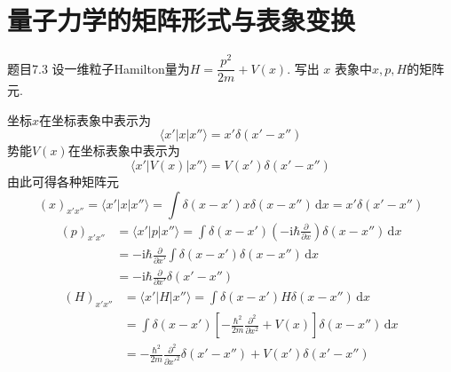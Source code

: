 \section{量子力学的矩阵形式与表象变换}

\begin{question}{题目7.3}
    设一维粒子Hamilton量为$H=\dfrac{p^2}{2m}+V(x)$. 写出 $x$ 表象中$x,p,H$的矩阵元.
\end{question}
\begin{solution}
    坐标$x$在坐标表象中表示为
    $$
        \langle x'|x|x'' \rangle = x'\delta(x'-x'')
    $$
    势能$V(x)$在坐标表象中表示为
    $$
        \langle x'|V(x)|x'' \rangle = V(x')\delta(x'-x'')
    $$
    由此可得各种矩阵元
    $$
        (x)_{x'x''} = \langle x'|x|x'' \rangle
        = \int\delta(x-x')x\delta(x-x'')\,\mathrm{d}x
        = x'\delta(x'-x'')
    $$
    $$
        \begin{aligned}
            (p)_{x'x''}
             & = \langle x'|p|x'' \rangle = \int\delta(x-x')\left(-\mathrm{i}\hbar\frac{\partial }{\partial x}\right)\delta(x-x'')\,\mathrm{d}x \\
             & = -\mathrm{i}\hbar\frac{\partial }{\partial x'}\int\delta(x-x')\delta(x-x'')\,\mathrm{d}x                                        \\
             & = -\mathrm{i}\hbar\frac{\partial }{\partial x'}\delta(x'-x'')
        \end{aligned}
    $$
    $$
        \begin{aligned}
            (H)_{x'x''}
             & =\langle x'|H|x'' \rangle =\int\delta(x-x')H\delta(x-x'')\,\mathrm{d}x                                          \\
             & =\int\delta(x-x')\left[-\frac{\hbar^2}{2m}\frac{\partial^2}{\partial x^2}+V(x)\right]\delta(x-x'')\,\mathrm{d}x \\
             & =-\frac{\hbar^2}{2m}\frac{\partial^2}{\partial x'^2}\delta(x'-x'') + V(x')\delta(x'-x'')                        \\
        \end{aligned}
    $$
\end{solution}


